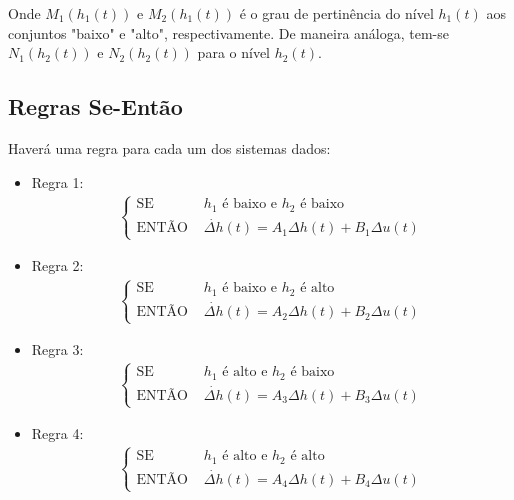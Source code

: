 Onde $M_1(h_1(t))$ e $M_2(h_1(t))$ é o grau de pertinência do nível $h_1(t)$ aos conjuntos "baixo" e "alto", respectivamente. De maneira análoga, tem-se $N_1(h_2(t))$ e $N_2(h_2(t))$ para o nível $h_2(t)$.

\subsection{Regras Se-Então}
Haverá uma regra para cada um dos sistemas dados:

	\begin{itemize}
		\item Regra 1:\\ 
		\begin{align*}
			\begin{cases}
				\text{SE } &h_1 \text{ é baixo e } h_2 \text{ é baixo} \\
				\text{ENTÃO } &\dot{\Delta h}(t) =  A_1 \Delta h(t) +  B_1 \Delta u(t)
			\end{cases}		
		\end{align*}

		\item Regra 2:\\ 
		\begin{align*}
		\begin{cases}
			\text{SE } &h_1 \text{ é baixo e } h_2 \text{ é alto} \\
			\text{ENTÃO } &\dot{\Delta h}(t) =  A_2 \Delta h(t) +  B_2 \Delta u(t)
		\end{cases}		
		\end{align*}

		\item Regra 3:\\ 
		\begin{align*}
		\begin{cases}
			\text{SE } &h_1 \text{ é alto e } h_2 \text{ é baixo} \\
			\text{ENTÃO } &\dot{\Delta h}(t) =  A_3 \Delta h(t) +  B_3 \Delta u(t)
		\end{cases}		
		\end{align*}

		\item Regra 4:\\ 
		\begin{align*}
		\begin{cases}
			\text{SE } &h_1 \text{ é alto e } h_2 \text{ é alto} \\
			\text{ENTÃO } &\dot{\Delta h}(t) =  A_4 \Delta h(t) +  B_4 \Delta u(t)
		\end{cases}		
		\end{align*}
	\end{itemize}

